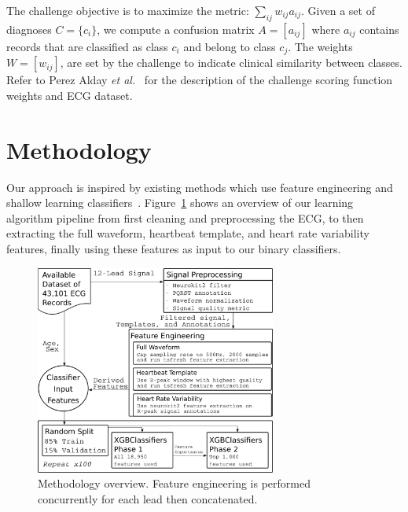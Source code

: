 \documentclass[twocolumn]{cinc}
\begin{document}
The challenge objective is to maximize the metric: $\sum_{ij} w_{ij} a_{ij}$.
Given a set of diagnoses $C = \{c_i\}$, we compute a confusion matrix $A = [a_{ij}]$ where $a_{ij}$ contains records that are classified as class $c_i$ and belong to class $c_j$.
The weights $W = [w_{ij}]$, are set by the challenge to indicate clinical similarity between classes.
Refer to Perez Alday \emph{et al.}~\cite{physionet_challenge_2020} for the description of the challenge scoring function weights and ECG dataset.

\section{Methodology}

Our approach is inspired by existing methods which use feature engineering and shallow learning classifiers~\cite{goodwin_classification_2017}.
Figure~\ref{fig:methodology} shows an overview of our learning algorithm pipeline from first cleaning and preprocessing the ECG, to then extracting the full waveform, heartbeat template, and heart rate variability features, finally using these features as input to our binary classifiers.

\begin{figure}[tbp]
  \centering
  \includegraphics[width=7.9cm]{fig/methodology_svg.png}
  \caption{Methodology overview. Feature engineering is performed concurrently for each lead then concatenated.}
  \label{fig:methodology}
\end{figure}
\end{document}
